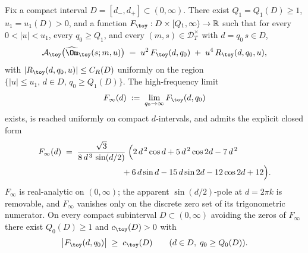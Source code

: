 \begin{lemma}
\label{lem:toy-anomaly-leading}
Fix a compact interval \(D=[d_-,d_+]\subset(0,\infty)\).  There exist
\(Q_1=Q_1(D)\ge1\), \(u_1=u_1(D)>0\), and a function
\(F_\toy:D\times[Q_1,\infty)\to\mathbb R\) such that for every
\(0<|u|<u_1\), every \(q_0\ge Q_1\), and every
\((m,s)\in\mathcal D_T^\times\) with \(d=q_0\,s\in D\),
\begin{equation}
\label{eq:toy-anomaly-leading}
\mathcal A_\toy\bigl(\widehat\Om_\toy(s;m,u)\bigr)
\;=\;u^2\,F_\toy(d,q_0)\;+\;u^4\,R_\toy(d,q_0,u),
\end{equation}
with \(|R_\toy(d,q_0,u)|\le C_R(D)\) uniformly on the region
\(\{|u|\le u_1,\,d\in D,\,q_0\ge Q_1(D)\}\).  The high-frequency limit
\begin{equation}
\label{eq:F-toy-asymptotic}
        F_{\infty}(d)\;:=\;\lim_{q_0\to\infty}F_\toy(d,q_0)
\end{equation}
exists, is reached uniformly on compact \(d\)-intervals, and admits
the explicit closed form
\begin{equation}
\label{eq:F-toy-closed-form}
\begin{aligned}
F_{\infty}(d)
\;&=\;\frac{\sqrt 3}{8\,d^{\,3}\,\sin(d/2)}\;\Bigl(
2\,d^{\,2}\cos d+5\,d^{\,2}\cos 2d-7\,d^{\,2}\\
&\qquad\qquad\qquad\quad
+6\,d\sin d-15\,d\sin 2d-12\cos 2d+12\Bigr).
\end{aligned}
\end{equation}
\(F_{\infty}\) is real-analytic on \((0,\infty)\); the apparent
\(\sin(d/2)\)-pole at \(d=2\pi k\) is removable, and \(F_{\infty}\)
vanishes only on the discrete zero set of its trigonometric
numerator.  On every compact subinterval \(D\subset(0,\infty)\)
avoiding the zeros of \(F_{\infty}\) there exist \(Q_0(D)\ge 1\) and
\(c_\toy(D)>0\) with
\begin{equation}
\label{eq:F-toy-lower-bound}
        \bigl|F_\toy(d,q_0)\bigr|\;\ge\;c_\toy(D)
        \qquad (d\in D,\;q_0\ge Q_0(D)).
\end{equation}
\end{lemma}

